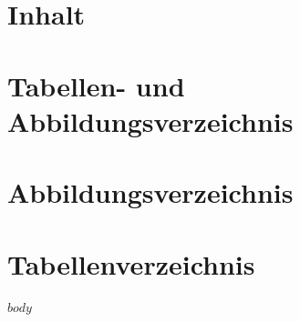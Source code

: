 \documentclass[twoside, pagesize, fontsize=11pt, dvipsnames]{scrreport} %
\begin{document}
\clearpage
\section*{Inhalt}
\label{sec:inhalt}

\tableofcontents

\clearpage

\section*{Tabellen- und Abbildungsverzeichnis}


\section*{Abbildungsverzeichnis}
\label{sec:Abbildungsverzeichnis}

\listoffigures

\section*{Tabellenverzeichnis}
\label{sec:tabellenverzeichnis}

\listoftables

\cleardoublepage




$body$



\end{document}
